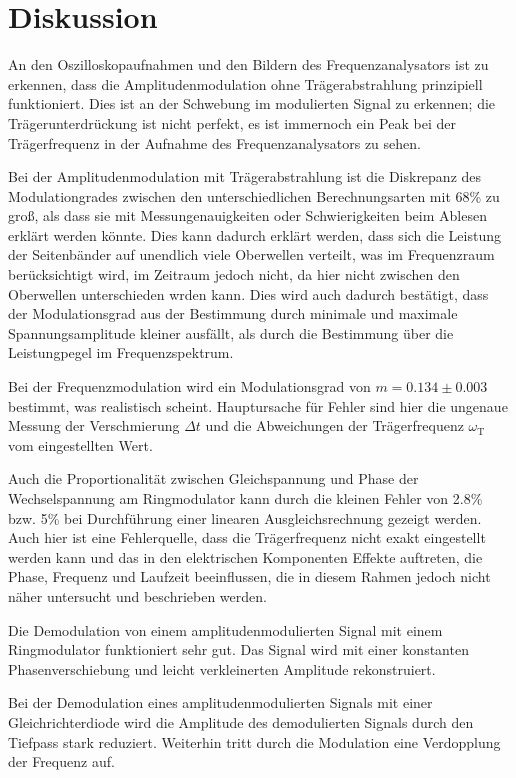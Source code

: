 \section{Diskussion}

An den Oszilloskopaufnahmen und den Bildern des Frequenzanalysators ist zu erkennen, dass die Amplitudenmodulation ohne Trägerabstrahlung prinzipiell funktioniert. Dies ist an der Schwebung im modulierten Signal zu erkennen; die Trägerunterdrückung ist nicht perfekt, es ist immernoch ein Peak bei der Trägerfrequenz in der Aufnahme des Frequenzanalysators zu sehen.

Bei der Amplitudenmodulation mit Trägerabstrahlung ist die Diskrepanz des Modulationgrades zwischen den unterschiedlichen Berechnungsarten mit 68\% zu groß, als dass sie mit Messungenauigkeiten oder Schwierigkeiten beim Ablesen erklärt werden könnte. Dies kann dadurch erklärt werden, dass sich die Leistung der Seitenbänder auf unendlich viele Oberwellen verteilt, was im Frequenzraum berücksichtigt wird, im Zeitraum jedoch nicht, da hier nicht zwischen den Oberwellen unterschieden wrden kann. Dies wird auch dadurch bestätigt, dass der Modulationsgrad aus der Bestimmung durch minimale und maximale Spannungsamplitude kleiner ausfällt, als durch die Bestimmung über die Leistungpegel im Frequenzspektrum.\par 

Bei der Frequenzmodulation wird ein Modulationsgrad von $m = 0.134 \pm 0.003$ bestimmt, was realistisch scheint. Hauptursache für Fehler sind hier die ungenaue Messung der Verschmierung $\Delta t$ und die Abweichungen der Trägerfrequenz $\omega_\text{T}$ vom eingestellten Wert.\par

Auch die Proportionalität zwischen Gleichspannung und Phase der Wechselspannung am Ringmodulator kann durch die kleinen Fehler von 2.8\% bzw. 5\% bei Durchführung einer linearen Ausgleichsrechnung gezeigt werden. Auch hier ist eine Fehlerquelle, dass die Trägerfrequenz nicht exakt eingestellt werden kann und das in den elektrischen Komponenten Effekte auftreten, die Phase, Frequenz und Laufzeit beeinflussen, die in diesem Rahmen jedoch nicht näher untersucht und beschrieben werden.

Die Demodulation von einem amplitudenmodulierten Signal mit einem Ringmodulator funktioniert sehr gut. Das Signal wird mit einer konstanten Phasenverschiebung und leicht verkleinerten Amplitude rekonstruiert.

Bei der Demodulation eines amplitudenmodulierten Signals mit einer Gleichrichterdiode wird die Amplitude des demodulierten Signals durch den Tiefpass stark reduziert. Weiterhin tritt durch die Modulation eine Verdopplung der Frequenz auf.

